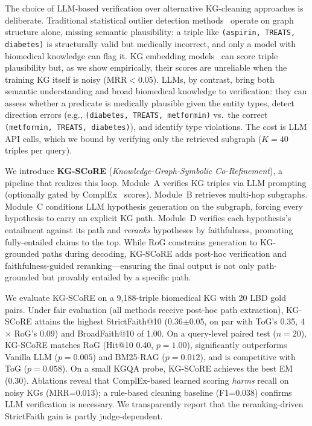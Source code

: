 The choice of LLM-based verification over alternative KG-cleaning approaches is deliberate. Traditional statistical outlier detection methods~\cite{yao2021typing} operate on graph structure alone, missing semantic plausibility: a triple like \texttt{(aspirin, TREATS, diabetes)} is structurally valid but medically incorrect, and only a model with biomedical knowledge can flag it. KG embedding models~\cite{trouillon2016complex,sun2019rotate} can score triple plausibility but, as we show empirically, their scores are unreliable when the training KG itself is noisy (MRR$<$0.05). LLMs, by contrast, bring both semantic understanding and broad biomedical knowledge to verification: they can assess whether a predicate is medically plausible given the entity types, detect direction errors (e.g., \texttt{(diabetes, TREATS, metformin)} vs.\ the correct \texttt{(metformin, TREATS, diabetes)}), and identify type violations. The cost is LLM API calls, which we bound by verifying only the retrieved subgraph ($K{=}40$ triples per query).

We introduce \textbf{KG-SCoRE} (\emph{Knowledge-Graph-Symbolic Co-Refinement}), a pipeline that realizes this loop. Module~A verifies KG triples via LLM prompting (optionally gated by ComplEx~\cite{trouillon2016complex} scores). Module~B retrieves multi-hop subgraphs. Module~C conditions LLM hypothesis generation on the subgraph, forcing every hypothesis to carry an explicit KG path. Module~D verifies each hypothesis's entailment against its path and \emph{reranks} hypotheses by faithfulness, promoting fully-entailed claims to the top. While RoG constrains generation to KG-grounded paths during decoding, KG-SCoRE adds post-hoc verification and faithfulness-guided reranking---ensuring the final output is not only path-grounded but provably entailed by a specific path.

We evaluate KG-SCoRE on a 9{,}188-triple biomedical KG with 20 LBD gold pairs. Under fair evaluation (all methods receive post-hoc path extraction), KG-SCoRE attains the highest StrictFaith@10 (0.36$\pm$0.05, on par with ToG's 0.35, 4$\times$ RoG's 0.09) and BroadFaith@10 of 1.00. On a query-level paired test ($n{=}20$), KG-SCoRE matches RoG (Hit@10 0.40, $p{=}1.00$), significantly outperforms Vanilla LLM ($p{=}0.005$) and BM25-RAG ($p{=}0.012$), and is competitive with ToG ($p{=}0.058$). On a small KGQA probe, KG-SCoRE achieves the best EM (0.30). Ablations reveal that ComplEx-based learned scoring \emph{harms} recall on noisy KGs (MRR=0.013); a rule-based cleaning baseline (F1=0.038) confirms LLM verification is necessary. We transparently report that the reranking-driven StrictFaith gain is partly judge-dependent.

